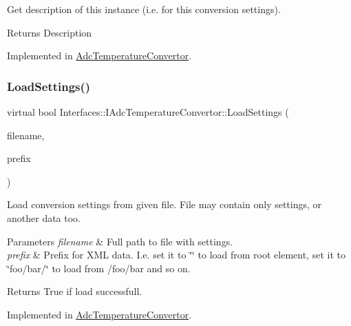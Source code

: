 Get description of this instance (i.\+e. for this conversion settings). 

\begin{DoxyReturn}{Returns}
Description 
\end{DoxyReturn}


Implemented in \hyperlink{class_adc_temperature_convertor_ad82afdddbac46a95b6da44e769180d10}{Adc\+Temperature\+Convertor}.

\mbox{\label{class_interfaces_1_1_i_adc_temperature_convertor_a3b1d84ea243b62a36238f16433668a23}} 
\subsubsection{\texorpdfstring{Load\+Settings()}{LoadSettings()}}
{\footnotesize\ttfamily virtual bool Interfaces\+::\+I\+Adc\+Temperature\+Convertor\+::\+Load\+Settings (\begin{DoxyParamCaption}\item[{Q\+String}]{filename,  }\item[{Q\+String}]{prefix }\end{DoxyParamCaption})\hspace{0.3cm}{\ttfamily [pure virtual]}}



Load conversion settings from given file. File may contain only settings, or another data too. 


\begin{DoxyParams}{Parameters}
{\em filename} & Full path to file with settings. \\
\hline
{\em prefix} & Prefix for X\+ML data. I.\+e. set it to \char`\"{}\char`\"{} to load from root element, set it to \char`\"{}foo/bar/\char`\"{} to load from /foo/bar and so on. \\
\hline
\end{DoxyParams}
\begin{DoxyReturn}{Returns}
True if load successfull. 
\end{DoxyReturn}


Implemented in \hyperlink{class_adc_temperature_convertor_ac45f10e678aa2f9e25c5351dfd283de0}{Adc\+Temperature\+Convertor}.

